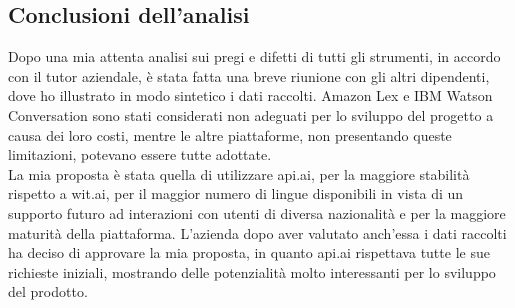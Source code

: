 \subsection{Conclusioni dell'analisi}
Dopo una mia attenta analisi sui pregi e difetti di tutti gli strumenti, in accordo con il tutor aziendale, è stata fatta una breve riunione con gli altri dipendenti, dove ho illustrato in modo sintetico i dati raccolti. Amazon Lex e IBM Watson Conversation sono stati considerati non adeguati per lo sviluppo del progetto a causa dei loro costi, mentre le altre piattaforme, non presentando queste limitazioni, potevano essere tutte adottate. \\
La mia proposta è stata quella di utilizzare api.ai, per la maggiore stabilità rispetto a wit.ai, per il maggior numero di lingue disponibili in vista di un supporto futuro ad interazioni con utenti di diversa nazionalità e per la maggiore maturità della piattaforma. L'azienda dopo aver valutato anch'essa i dati raccolti ha deciso di approvare la mia proposta, in quanto api.ai rispettava tutte le sue richieste iniziali, mostrando delle potenzialità molto interessanti per lo sviluppo del prodotto.